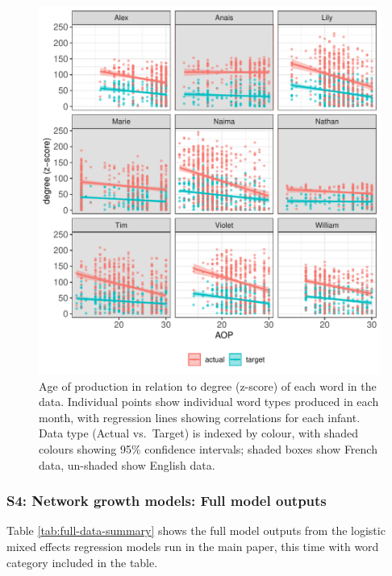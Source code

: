 \documentclass[
  man,floatsintext]{apa6}
\begin{document}
\begin{figure}
\centering
\includegraphics{PhonNetworksSupplementaryData_files/figure-latex/Figure-AOP-deg-corr-1.pdf}
\caption{\label{fig:Figure-AOP-deg-corr}Age of production in relation to degree (z-score) of each word in the data. Individual points show individual word types produced in each month, with regression lines showing correlations for each infant. Data type (Actual vs.~Target) is indexed by colour, with shaded colours showing 95\% confidence intervals; shaded boxes show French data, un-shaded show English data.}
\end{figure}

\newpage

\hypertarget{s4-network-growth-models-full-model-outputs}{%
\subsubsection{S4: Network growth models: Full model outputs}\label{s4-network-growth-models-full-model-outputs}}

Table \ref{tab:full-data-summary} shows the full model outputs from the logistic mixed effects regression models run in the main paper, this time with word category included in the table.
\end{document}
